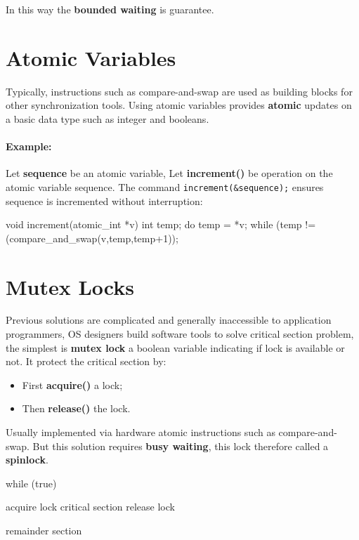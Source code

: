 In this way the \textbf{bounded waiting} is guarantee.

\section{Atomic Variables}
Typically, instructions such as compare-and-swap are used as building blocks for other synchronization tools. Using atomic variables provides \textbf{atomic} updates on a basic data type such as integer and booleans.


\paragraph{Example: } Let \textbf{sequence} be an atomic variable, Let \textbf{increment()} be operation on the atomic variable
sequence. The command \verb|increment(&sequence);| ensures sequence is incremented without interruption:

\begin{codeInC}
void increment(atomic_int *v){
    int temp;
    do {
        temp = *v;
    }while (temp != (compare_and_swap(v,temp,temp+1));
}

\end{codeInC}

\section{Mutex Locks}

Previous solutions are complicated and generally inaccessible to
application programmers, OS designers build software tools to solve critical section problem, the simplest is \textbf{mutex lock} a boolean variable indicating if lock is available or not. It protect the critical section by:

\begin{itemize}
    \item First \textbf{acquire()} a lock;
    \item Then \textbf{release()} the lock.
\end{itemize}

Usually implemented via hardware atomic instructions such as
compare-and-swap. But this solution requires \textbf{busy waiting}, this lock therefore called a \textbf{spinlock}.


\begin{codeInC}
while (true) {
    acquire lock
        critical section
    release lock
    
    remainder section
} 

\end{codeInC}


